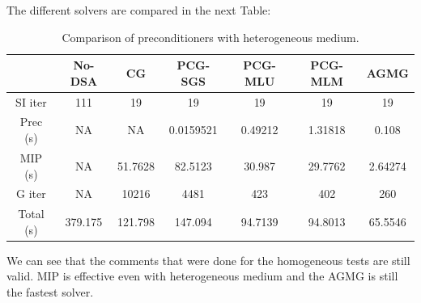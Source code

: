 The different solvers are compared in the next Table:
\begin{table}[H]
\begin{center}
\caption{Comparison of preconditioners with heterogeneous medium.}
\begin{tabular}{|c|c|c|c|c|c|c|}
\hline
 & No-DSA & CG & PCG-SGS & PCG-MLU & PCG-MLM & AGMG\\
\hline
  SI iter & 111     & 19      & 19        & 19      & 19      & 19 \\
 Prec (s) & NA      & NA      & 0.0159521 & 0.49212 & 1.31818 & 0.108 \\
  MIP (s) & NA      & 51.7628 & 82.5123   & 30.987  & 29.7762 & 2.64274 \\
   G iter & NA      & 10216   & 4481      & 423     & 402     & 260 \\
Total (s) & 379.175 & 121.798 & 147.094   & 94.7139 & 94.8013 & 65.5546 \\
\hline
\end{tabular}
\end{center}
\end{table}
We can see that the comments that were done for the homogeneous tests are
still valid. MIP is effective even with heterogeneous medium and the AGMG is
still the fastest solver.

